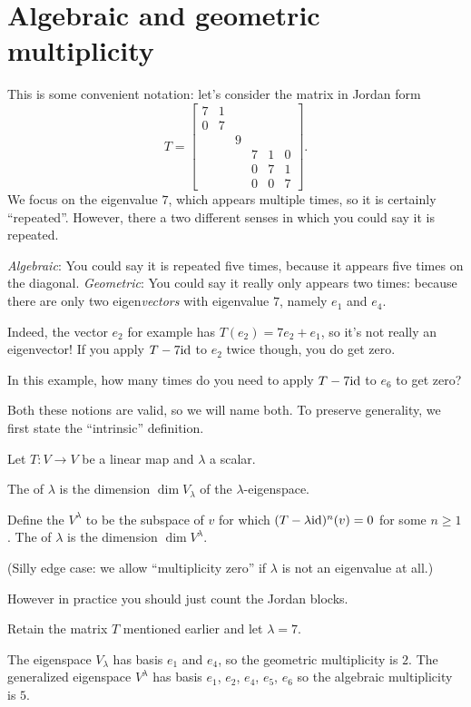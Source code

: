 \section{Algebraic and geometric multiplicity}
This is some convenient notation:
let's consider the matrix in Jordan form
\[
	T =
	\begin{bmatrix}
		7 & 1 \\
		0 & 7 \\
		& & 9 \\
		& & & 7 & 1 & 0 \\
		& & & 0 & 7 & 1 \\
		& & & 0 & 0 & 7
	\end{bmatrix}.
\]
We focus on the eigenvalue $7$,
which appears multiple times, so it is certainly ``repeated''.
However, there a two different senses in which you could say it is repeated.
\begin{itemize}
	\ii \emph{Algebraic}: You could say it is repeated five times,
	because it appears five times on the diagonal.
	\ii \emph{Geometric}: You could say it really only appears two times:
	because there are only two eigen\emph{vectors}
	with eigenvalue $7$, namely $e_1$ and $e_4$.

	Indeed, the vector $e_2$ for example has $T(e_2) = 7e_2 + e_1$,
	so it's not really an eigenvector!
	If you apply $T - 7\mathrm{id}$ to $e_2$ twice though,
	you do get zero.
\end{itemize}
\begin{ques}
	In this example,
	how many times do you need to apply $T - 7\mathrm{id}$ to $e_6$ to get zero?
\end{ques}
Both these notions are valid,
so we will name both.
To preserve generality,
we first state the ``intrinsic'' definition.
\begin{definition}
	Let $T \colon V \to V$ be a linear map and $\lambda$ a scalar.
	\begin{itemize}
		\ii The 
		of $\lambda$ is the dimension $\dim V_\lambda$
		of the $\lambda$-eigenspace.

		\ii Define the 
		$V^\lambda$ to be the subspace of $v$
		for which $(T-\lambda \mathrm{id})^n(v) = 0$ for some $n \ge 1$.
		The  of $\lambda$ is the
		dimension $\dim V^\lambda$.
	\end{itemize}
	(Silly edge case: we allow ``multiplicity zero''
	if $\lambda$ is not an eigenvalue at all.)
\end{definition}
However in practice you should just count the Jordan blocks.
\begin{example}
	Retain the matrix $T$ mentioned earlier and let $\lambda = 7$.
	\begin{itemize}
		\ii The eigenspace $V_\lambda$ has basis $e_1$ and $e_4$,
		so the geometric multiplicity is $2$.
		\ii The generalized eigenspace $V^\lambda$ has basis $e_1$, $e_2$,
		$e_4$, $e_5$, $e_6$ so the algebraic multiplicity is $5$.
	\end{itemize}
\end{example}

